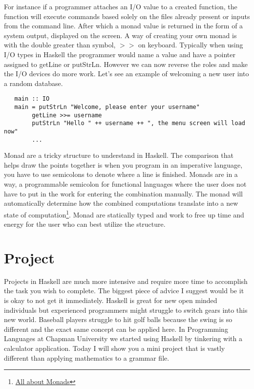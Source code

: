 \documentclass{article}
\begin{document}
\noindent For instance if a programmer attaches an I/O value to a created function, the function will execute commands based solely on the files already present or inputs from the command line. After which a monad value is returned in the form of a system output, displayed on the screen. A way of creating your own monad is with the double greater than symbol, $>>$ on keyboard. Typically when using I/O types in Haskell the programmer would name a value and have a pointer assigned to getLine or putStrLn. However we can now reverse the roles and make the I/O devices do more work. Let's see an example of welcoming a new user into a random database.

\begin{lstlisting}
   main :: IO
   main = putStrLn "Welcome, please enter your username"
        getLine >>= username
        putStrLn "Hello " ++ username ++ ", the menu screen will load now" 
        ...
\end{lstlisting}

\noindent Monad are a tricky structure to understand in Haskell. The comparison that helps draw the points together is when you program in an imperative language, you have to use semicolons to denote where a line is finished. Monads are in a way, a programmable semicolon for functional languages where the user does not have to put in the work for entering the combination manually. The monad will automatically determine how the combined computations translate into a new state of computation\footnote{\href{https://wiki.haskell.org/All_About_Monads}{All about Monads}}. Monad are statically typed and work to free up time and energy for the user who can best utilize the structure.
    

\section{Project}

Projects in Haskell are much more intensive and require more time to accomplish the task you wish to complete. The biggest piece of advice I suggest would be it is okay to not get it immediately. Haskell is great for new open minded individuals but experienced programmers might struggle to switch gears into this new world. Baseball players struggle to hit golf balls because the swing is so different and the exact same concept can be applied here. In Programming Languages at Chapman University we started using Haskell by tinkering with a calculator application. Today I will show you a mini project that is vastly different than applying mathematics to a grammar file. 
    
\end{document}
